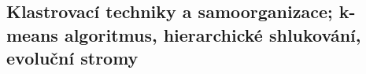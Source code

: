 \subsection{Klastrovací techniky a samoorganizace; k-means algoritmus, hierarchické shlukování, evoluční stromy}